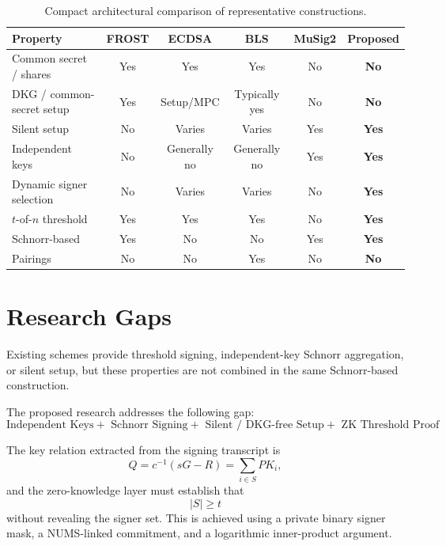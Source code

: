 \documentclass[10pt,a4paper]{article}
\begin{document}
\begin{table}[h]
\centering
\scriptsize
\renewcommand{\arraystretch}{1.12}
\setlength{\tabcolsep}{3pt}
\begin{tabular}{p{}ccccc}
\toprule
\textbf{Property} & \textbf{FROST} & \textbf{ECDSA} &
\textbf{BLS} & \textbf{MuSig2} & \textbf{Proposed}\\
\midrule
Common secret / shares
& Yes & Yes & Yes & No & \textbf{No}\\
DKG / common-secret setup
& Yes & Setup/MPC & Typically yes & No & \textbf{No}\\
Silent setup
& No & Varies & Varies & Yes & \textbf{Yes}\\
Independent keys
& No & Generally no & Generally no & Yes & \textbf{Yes}\\
Dynamic signer selection
& No & Varies & Varies & No & \textbf{Yes}\\
$t$-of-$n$ threshold
& Yes & Yes & Yes & No & \textbf{Yes}\\
Schnorr-based
& Yes & No & No & Yes & \textbf{Yes}\\
Pairings
& No & No & Yes & No & \textbf{No}\\
\bottomrule
\end{tabular}
\caption{Compact architectural comparison of representative constructions.}
\label{tab:comparison}
\end{table}

\section{Research Gaps}

Existing schemes provide threshold signing, independent-key Schnorr
aggregation, or silent setup, but these properties are not combined in the
same Schnorr-based construction.

The proposed research addresses the following gap:
\[
\boxed{
\text{Independent Keys}
+\text{ Schnorr Signing}
+\text{ Silent / DKG-free Setup}
+\text{ ZK Threshold Proof}
}
\]

The key relation extracted from the signing transcript is
\[
Q=c^{-1}(sG-R)=\sum_{i\in S}PK_i,
\]
and the zero-knowledge layer must establish that
\[
|S|\geq t
\]
without revealing the signer set. This is achieved using a private binary
signer mask, a NUMS-linked commitment, and a logarithmic inner-product
argument.
\end{document}

